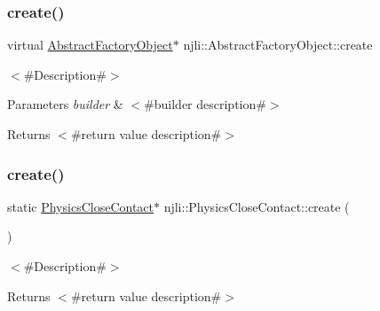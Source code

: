 \subsubsection{\texorpdfstring{create()}{create()}\hspace{0.1cm}{\footnotesize\ttfamily [1/3]}}
{\footnotesize\ttfamily virtual \mbox{\hyperlink{classnjli_1_1_abstract_factory_object}{Abstract\+Factory\+Object}}$\ast$ njli\+::\+Abstract\+Factory\+Object\+::create}

$<$\#\+Description\#$>$


\begin{DoxyParams}{Parameters}
{\em builder} & $<$\#builder description\#$>$\\
\hline
\end{DoxyParams}
\begin{DoxyReturn}{Returns}
$<$\#return value description\#$>$ 
\end{DoxyReturn}
\mbox{\label{classnjli_1_1_physics_close_contact_a798fa044971cb937c50ca688db22e7b5}} 
\subsubsection{\texorpdfstring{create()}{create()}\hspace{0.1cm}{\footnotesize\ttfamily [2/3]}}
{\footnotesize\ttfamily static \mbox{\hyperlink{classnjli_1_1_physics_close_contact}{Physics\+Close\+Contact}}$\ast$ njli\+::\+Physics\+Close\+Contact\+::create (\begin{DoxyParamCaption}{ }\end{DoxyParamCaption})\hspace{0.3cm}{\ttfamily [static]}}

$<$\#\+Description\#$>$

\begin{DoxyReturn}{Returns}
$<$\#return value description\#$>$ 
\end{DoxyReturn}
\mbox{\label{classnjli_1_1_physics_close_contact_a6cdd2f44f6e1dc6a8051e95977c2f374}} 
